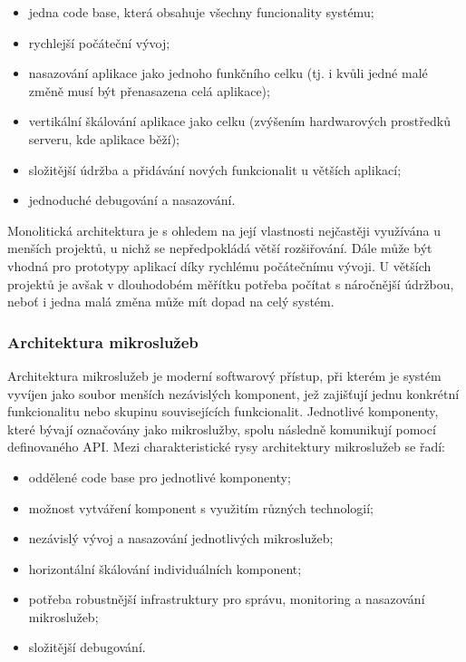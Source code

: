\begin{itemize}[topsep=0pt, itemsep=2pt]
    \item jedna code base, která obsahuje všechny funcionality systému;
    \item rychlejší počáteční vývoj;
    \item nasazování aplikace jako jednoho funkčního celku (tj. i kvůli jedné malé změně musí být přenasazena celá aplikace);
    \item vertikální škálování aplikace jako celku (zvýšením hardwarových prostředků serveru, kde aplikace běží);
    \item složitější údržba a přidávání nových funkcionalit u větších aplikací;
    \item jednoduché debugování a nasazování.
\end{itemize}
\vspace{5pt}

Monolitická architektura je s ohledem na její vlastnosti nejčastěji využívána u menších projektů, u nichž se nepředpokládá větší rozšiřování. Dále může být vhodná pro prototypy aplikací díky rychlému počátečnímu vývoji. U větších projektů je avšak v dlouhodobém měřítku potřeba počítat s náročnější údržbou, neboť i jedna malá změna může mít dopad na celý systém. \cite{monoliths-vs-microservices-1, monoliths-vs-microservices-2}

\subsubsection{Architektura mikroslužeb}
Architektura mikroslužeb je moderní softwarový přístup, při kterém je systém vyvíjen jako soubor menších nezávislých komponent, jež zajišťují jednu konkrétní funkcionalitu nebo skupinu souvisejících funkcionalit. Jednotlivé komponenty, které bývají označovány jako mikroslužby, spolu následně komunikují pomocí definovaného API. Mezi charakteristické rysy architektury mikroslužeb se řadí:

\begin{itemize}[topsep=0pt, itemsep=2pt]
    \item oddělené code base pro jednotlivé komponenty;
    \item možnost vytváření komponent s využitím různých technologií;
    \item nezávislý vývoj a nasazování jednotlivých mikroslužeb;
    \item horizontální škálování individuálních komponent;
    \item potřeba robustnější infrastruktury pro správu, monitoring a nasazování mikroslužeb;
    \item složitější debugování.
\end{itemize}
\vspace{5pt}

